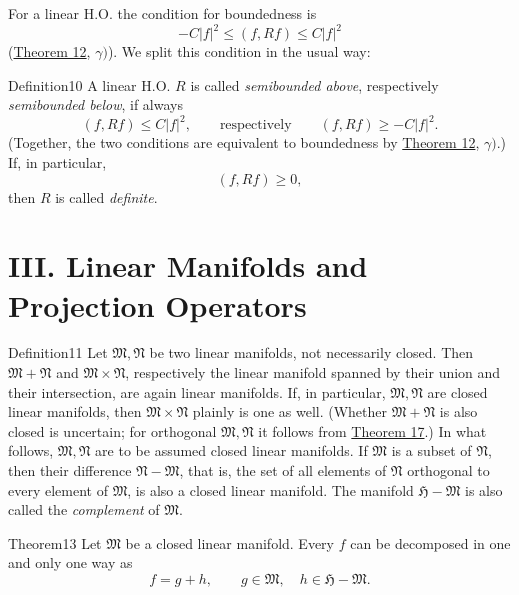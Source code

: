 ﻿\documentclass[paper=b5,fontsize=13pt,bookmarkpackage=false,twoside]{scrartcl}
\begin{document}
For a linear H.O. the condition for boundedness is
\[
-C|f|^2\le(f,Rf)\le C|f|^2
\]
(\hyperref[thm:12]{Theorem 12}, $\gamma)$). We split this condition in the usual way:

\begin{namedstatement}{Definition}{10}\label{def:10}
A linear H.O. $R$ is called \emph{semibounded above}, respectively \emph{semibounded below}, if always
\[
(f,Rf)\le C|f|^2,
\qquad\text{respectively}\qquad
(f,Rf)\ge -C|f|^2.
\]
(Together, the two conditions are equivalent to boundedness by \hyperref[thm:12]{Theorem 12}, $\gamma)$.) If, in particular,
\[
(f,Rf)\ge0,
\]
then $R$ is called \emph{definite}.
\end{namedstatement}

\section*{III. Linear Manifolds and Projection Operators}\label{chap:III}

\begin{namedstatement}{Definition}{11}\label{def:11}
Let $\mathfrak M,\mathfrak N$ be two linear manifolds, not necessarily closed. Then $\mathfrak M+\mathfrak N$ and $\mathfrak M\times\mathfrak N$, respectively the linear manifold spanned by their union and their intersection, are again linear manifolds. If, in particular, $\mathfrak M,\mathfrak N$ are closed linear manifolds, then $\mathfrak M\times\mathfrak N$ plainly is one as well. (Whether $\mathfrak M+\mathfrak N$ is also closed is uncertain; for orthogonal $\mathfrak M,\mathfrak N$ it follows from \hyperref[thm:17]{Theorem 17}.) In what follows, $\mathfrak M,\mathfrak N$ are to be assumed closed linear manifolds. If $\mathfrak M$ is a subset of $\mathfrak N$, then their difference $\mathfrak N-\mathfrak M$, that is, the set of all elements of $\mathfrak N$ orthogonal to every element of $\mathfrak M$, is also a closed linear manifold. The manifold $\mathfrak H-\mathfrak M$ is also called the \emph{complement} of $\mathfrak M$.
\end{namedstatement}

\begin{namedstatement}{Theorem}{13}\label{thm:13}
Let $\mathfrak M$ be a closed linear manifold. Every $f$ can be decomposed in one and only one way as
\[
f=g+h,\qquad g\in\mathfrak M,\quad h\in\mathfrak H-\mathfrak M.
\]
\end{namedstatement}
\end{document}
